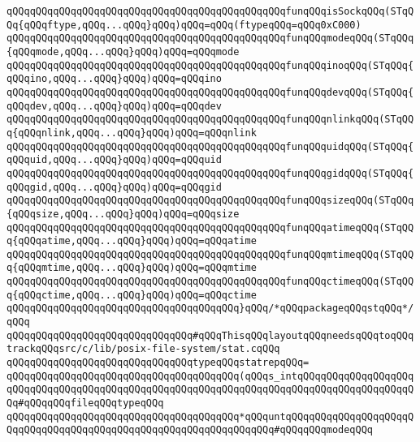 \verb|qQQqqQQqqQQqqQQqqQQqqQQqqQQqqQQqqQQqqQQqqQQqqQQqfunqQQqisSockqQQq(STqQQq{qQQqftype,qQQq...qQQq}qQQq)qQQq=qQQq(ftypeqQQq=qQQq0xC000)|\newline
\newline
\verb|qQQqqQQqqQQqqQQqqQQqqQQqqQQqqQQqqQQqqQQqqQQqqQQqfunqQQqmodeqQQq(STqQQq{qQQqmode,qQQq...qQQq}qQQq)qQQq=qQQqmode|\newline
\verb|qQQqqQQqqQQqqQQqqQQqqQQqqQQqqQQqqQQqqQQqqQQqqQQqfunqQQqinoqQQq(STqQQq{qQQqino,qQQq...qQQq}qQQq)qQQq=qQQqino|\newline
\verb|qQQqqQQqqQQqqQQqqQQqqQQqqQQqqQQqqQQqqQQqqQQqqQQqfunqQQqdevqQQq(STqQQq{qQQqdev,qQQq...qQQq}qQQq)qQQq=qQQqdev|\newline
\verb|qQQqqQQqqQQqqQQqqQQqqQQqqQQqqQQqqQQqqQQqqQQqqQQqfunqQQqnlinkqQQq(STqQQq{qQQqnlink,qQQq...qQQq}qQQq)qQQq=qQQqnlink|\newline
\verb|qQQqqQQqqQQqqQQqqQQqqQQqqQQqqQQqqQQqqQQqqQQqqQQqfunqQQquidqQQq(STqQQq{qQQquid,qQQq...qQQq}qQQq)qQQq=qQQquid|\newline
\verb|qQQqqQQqqQQqqQQqqQQqqQQqqQQqqQQqqQQqqQQqqQQqqQQqfunqQQqgidqQQq(STqQQq{qQQqgid,qQQq...qQQq}qQQq)qQQq=qQQqgid|\newline
\verb|qQQqqQQqqQQqqQQqqQQqqQQqqQQqqQQqqQQqqQQqqQQqqQQqfunqQQqsizeqQQq(STqQQq{qQQqsize,qQQq...qQQq}qQQq)qQQq=qQQqsize|\newline
\verb|qQQqqQQqqQQqqQQqqQQqqQQqqQQqqQQqqQQqqQQqqQQqqQQqfunqQQqatimeqQQq(STqQQq{qQQqatime,qQQq...qQQq}qQQq)qQQq=qQQqatime|\newline
\verb|qQQqqQQqqQQqqQQqqQQqqQQqqQQqqQQqqQQqqQQqqQQqqQQqfunqQQqmtimeqQQq(STqQQq{qQQqmtime,qQQq...qQQq}qQQq)qQQq=qQQqmtime|\newline
\verb|qQQqqQQqqQQqqQQqqQQqqQQqqQQqqQQqqQQqqQQqqQQqqQQqfunqQQqctimeqQQq(STqQQq{qQQqctime,qQQq...qQQq}qQQq)qQQq=qQQqctime|\newline
\verb|qQQqqQQqqQQqqQQqqQQqqQQqqQQqqQQqqQQqqQQq}qQQq/*qQQqpackageqQQqstqQQq*/qQQq|\newline
\newline
\verb|qQQqqQQqqQQqqQQqqQQqqQQqqQQqqQQq#qQQqThisqQQqlayoutqQQqneedsqQQqtoqQQqtrackqQQqsrc/c/lib/posix-file-system/stat.cqQQq|\newline
\verb|qQQqqQQqqQQqqQQqqQQqqQQqqQQqqQQqtypeqQQqstatrepqQQq=|\newline
\verb|qQQqqQQqqQQqqQQqqQQqqQQqqQQqqQQqqQQqqQQq(qQQqs_intqQQqqQQqqQQqqQQqqQQqqQQqqQQqqQQqqQQqqQQqqQQqqQQqqQQqqQQqqQQqqQQqqQQqqQQqqQQqqQQqqQQqqQQqqQQq#qQQqqQQqfileqQQqtypeqQQq|\newline
\verb|qQQqqQQqqQQqqQQqqQQqqQQqqQQqqQQqqQQqqQQq*qQQquntqQQqqQQqqQQqqQQqqQQqqQQqqQQqqQQqqQQqqQQqqQQqqQQqqQQqqQQqqQQqqQQqqQQq#qQQqqQQqmodeqQQq|\newline
